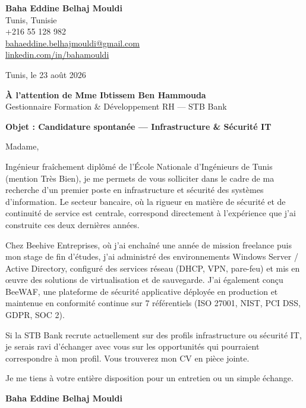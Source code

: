 \documentclass[a4paper,11pt]{article}
\begin{document}
\begin{flushright}
{\bfseries Baha Eddine Belhaj Mouldi}\\
Tunis, Tunisie\\
+216 55 128 982\\
\href{mailto:bahaeddine.belhajmouldi@gmail.com}{bahaeddine.belhajmouldi@gmail.com}\\
\href{https://linkedin.com/in/bahamouldi}{linkedin.com/in/bahamouldi}
\end{flushright}
\vspace{0.8cm}
\begin{flushleft}
Tunis, le 23 ao\^ut 2026
\vspace{0.8cm}

{\bfseries \`A l'attention de Mme Ibtissem Ben Hammouda}\\
Gestionnaire Formation \& D\'eveloppement RH --- STB Bank
\vspace{0.6cm}

{\bfseries Objet : Candidature spontan\'ee --- Infrastructure \& S\'ecurit\'e IT}
\end{flushleft}
\vspace{0.6cm}
Madame,

Ing\'enieur fra\^ichement dipl\^om\'e de l'\'Ecole Nationale d'Ing\'enieurs de Tunis (mention Tr\`es Bien), je me permets de vous solliciter dans le cadre de ma recherche d'un premier poste en infrastructure et s\'ecurit\'e des syst\`emes d'information. Le secteur bancaire, o\`u la rigueur en mati\`ere de s\'ecurit\'e et de continuit\'e de service est centrale, correspond directement \`a l'exp\'erience que j'ai construite ces deux derni\`eres ann\'ees.

Chez Beehive Entreprises, o\`u j'ai encha\^in\'e une ann\'ee de mission freelance puis mon stage de fin d'\'etudes, j'ai administr\'e des environnements Windows Server / Active Directory, configur\'e des services r\'eseau (DHCP, VPN, pare-feu) et mis en \oe uvre des solutions de virtualisation et de sauvegarde. J'ai \'egalement con\c cu BeeWAF, une plateforme de s\'ecurit\'e applicative d\'eploy\'ee en production et maintenue en conformit\'e continue sur 7 r\'ef\'erentiels (ISO 27001, NIST, PCI DSS, GDPR, SOC 2).

Si la STB Bank recrute actuellement sur des profils infrastructure ou s\'ecurit\'e IT, je serais ravi d'\'echanger avec vous sur les opportunit\'es qui pourraient correspondre \`a mon profil. Vous trouverez mon CV en pi\`ece jointe.

Je me tiens \`a votre enti\`ere disposition pour un entretien ou un simple \'echange.

\vspace{0.8cm}
\begin{flushright}
{\bfseries Baha Eddine Belhaj Mouldi}
\end{flushright}
\end{document}
